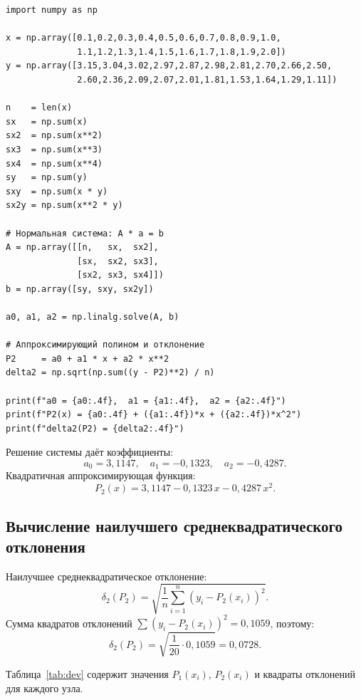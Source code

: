 \begin{lstlisting}[caption={Квадратичная аппроксимация МНК}, label=lst:quadratic]
import numpy as np

x = np.array([0.1,0.2,0.3,0.4,0.5,0.6,0.7,0.8,0.9,1.0,
              1.1,1.2,1.3,1.4,1.5,1.6,1.7,1.8,1.9,2.0])
y = np.array([3.15,3.04,3.02,2.97,2.87,2.98,2.81,2.70,2.66,2.50,
              2.60,2.36,2.09,2.07,2.01,1.81,1.53,1.64,1.29,1.11])

n    = len(x)
sx   = np.sum(x)
sx2  = np.sum(x**2)
sx3  = np.sum(x**3)
sx4  = np.sum(x**4)
sy   = np.sum(y)
sxy  = np.sum(x * y)
sx2y = np.sum(x**2 * y)

# Нормальная система: A * a = b
A = np.array([[n,   sx,  sx2],
              [sx,  sx2, sx3],
              [sx2, sx3, sx4]])
b = np.array([sy, sxy, sx2y])

a0, a1, a2 = np.linalg.solve(A, b)

# Аппроксимирующий полином и отклонение
P2     = a0 + a1 * x + a2 * x**2
delta2 = np.sqrt(np.sum((y - P2)**2) / n)

print(f"a0 = {a0:.4f},  a1 = {a1:.4f},  a2 = {a2:.4f}")
print(f"P2(x) = {a0:.4f} + ({a1:.4f})*x + ({a2:.4f})*x^2")
print(f"delta2(P2) = {delta2:.4f}")
\end{lstlisting}

Решение системы даёт коэффициенты:
\[
a_0 = 3{,}1147, \quad a_1 = -0{,}1323, \quad a_2 = -0{,}4287.
\]
Квадратичная аппроксимирующая функция:
\[
P_2(x) = 3{,}1147 - 0{,}1323\,x - 0{,}4287\,x^2.
\]

\subsection{Вычисление наилучшего среднеквадратического отклонения}

Наилучшее среднеквадратическое отклонение:
\[
\delta_2(P_2) = \sqrt{\frac{1}{n}\sum_{i=1}^{n}(y_i - P_2(x_i))^2}.
\]
Сумма квадратов отклонений $\sum(y_i - P_2(x_i))^2 = 0{,}1059$, поэтому:
\[
\delta_2(P_2) = \sqrt{\frac{1}{20} \cdot 0{,}1059} = 0{,}0728.
\]

Таблица~\ref{tab:dev} содержит значения $P_1(x_i)$, $P_2(x_i)$ и квадраты
отклонений для каждого узла.

